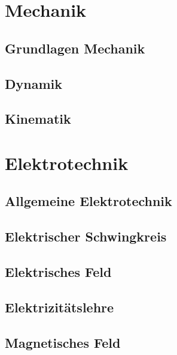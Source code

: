 \documentclass[a4paper, 11pt]{article}
\begin{document}
\section{Mechanik}

\subsection{Grundlagen Mechanik}


\subsection{Dynamik}


\subsection{Kinematik}


\section{Elektrotechnik}

\subsection{Allgemeine Elektrotechnik}


\subsection{Elektrischer Schwingkreis}


\subsection{Elektrisches Feld}


\subsection{Elektrizitätslehre}


\subsection{Magnetisches Feld}

\end{document}
